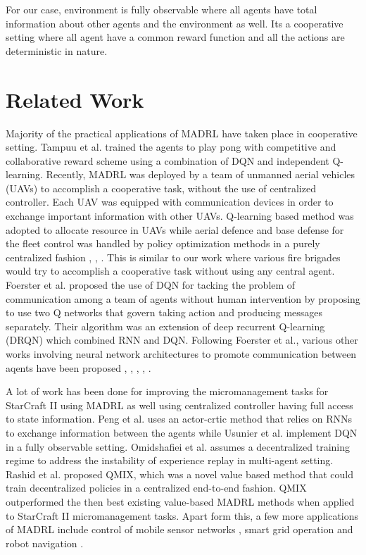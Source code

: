 \documentclass[12pt]{report}
\begin{document}
For our case, environment is fully observable where all agents have total information about other agents and the environment as well. Its a cooperative setting where all agent have a common reward function and all the actions are deterministic in nature. 

\chapter{Related Work}

Majority of the practical applications of MADRL have taken place in cooperative setting. Tampuu et al. \cite{Tampuu} trained the agents to play pong with competitive and collaborative reward scheme using a combination of DQN and independent Q-learning. Recently, MADRL was deployed by a team of unmanned aerial vehicles (UAVs) to accomplish a cooperative task, without the use of centralized controller. Each UAV was equipped with communication devices in order to exchange important information with other UAVs. Q-learning based method was adopted to allocate resource in UAVs while aerial defence and base defense for the fleet control was handled by policy optimization methods in a purely centralized fashion \cite{UAVs}, \cite{CooperativeAD}, \cite{UAV2}. This is similar to our work where various fire brigades would try to accomplish a cooperative task without using any central agent. Foerster et al. \cite{Communicate} proposed the use of DQN for tacking the problem of communication among a team of agents without human intervention by proposing to use two Q networks that govern taking action and producing messages separately. Their algorithm was an extension of deep recurrent Q-learning (DRQN) \cite{Hausknecht2015DeepRQ} which combined RNN and DQN. Following Foerster et al., various other works involving neural network architectures to promote communication between aqents have been proposed \cite{Jorge2016LearningTP}, \cite{Sukhbaatar2016LearningMC}, \cite{Havrylov2017EmergenceOL}, \cite{Das2017LearningCV}, \cite{Peng2017MultiagentBN}. 

A lot of work has been done for improving the micromanagement tasks for StarCraft II using MADRL as well using centralized controller having full access to state information. Peng et al. \cite{Peng2017MultiagentBN} uses an actor-crtic method that relies on RNNs to exchange information between the agents while Usunier et al. \cite{Usunier2016EpisodicEF} implement DQN in a fully observable setting. Omidshafiei et al. \cite{Omidshafiei2017DeepDM} assumes a decentralized training regime to address the instability of experience replay in multi-agent setting. Rashid et al. \cite{Rashid2018QMIXMV} proposed QMIX, which was a novel value based method that could train decentralized policies in a centralized end-to-end fashion. QMIX outperformed the then best existing value-based MADRL methods when applied to StarCraft II micromanagement tasks. Apart form this, a few more applications of MADRL include control of mobile sensor networks \cite{cortes}, smart grid operation \cite{SmartGrid} and robot navigation \cite{corke}. 
\end{document}
